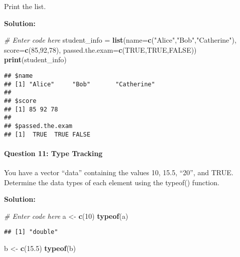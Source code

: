 \documentclass[
]{article}
\newenvironment{Shaded}{\begin{snugshade}}{\end{snugshade}}
\newcommand{\AttributeTok}[1]{\textcolor[rgb]{0.13,0.29,0.53}{#1}}
\newcommand{\CommentTok}[1]{\textcolor[rgb]{0.56,0.35,0.01}{\textit{#1}}}
\newcommand{\ConstantTok}[1]{\textcolor[rgb]{0.56,0.35,0.01}{#1}}
\newcommand{\DecValTok}[1]{\textcolor[rgb]{0.00,0.00,0.81}{#1}}
\newcommand{\FloatTok}[1]{\textcolor[rgb]{0.00,0.00,0.81}{#1}}
\newcommand{\FunctionTok}[1]{\textcolor[rgb]{0.13,0.29,0.53}{\textbf{#1}}}
\newcommand{\NormalTok}[1]{#1}
\newcommand{\OtherTok}[1]{\textcolor[rgb]{0.56,0.35,0.01}{#1}}
\newcommand{\StringTok}[1]{\textcolor[rgb]{0.31,0.60,0.02}{#1}}
\begin{document}
Print the list.

\textbf{Solution:}

\begin{Shaded}
\begin{Highlighting}[]
\CommentTok{\# Enter code here}
\NormalTok{student\_info }\OtherTok{=} \FunctionTok{list}\NormalTok{(}\AttributeTok{name=}\FunctionTok{c}\NormalTok{(}\StringTok{"Alice"}\NormalTok{,}\StringTok{"Bob"}\NormalTok{,}\StringTok{"Catherine"}\NormalTok{), }\AttributeTok{score=}\FunctionTok{c}\NormalTok{(}\DecValTok{85}\NormalTok{,}\DecValTok{92}\NormalTok{,}\DecValTok{78}\NormalTok{), }\AttributeTok{passed.the.exam=}\FunctionTok{c}\NormalTok{(}\ConstantTok{TRUE}\NormalTok{,}\ConstantTok{TRUE}\NormalTok{,}\ConstantTok{FALSE}\NormalTok{))}
\FunctionTok{print}\NormalTok{(student\_info)}
\end{Highlighting}
\end{Shaded}

\begin{verbatim}
## $name
## [1] "Alice"     "Bob"       "Catherine"
## 
## $score
## [1] 85 92 78
## 
## $passed.the.exam
## [1]  TRUE  TRUE FALSE
\end{verbatim}

\hypertarget{question-11-type-tracking}{%
\paragraph{Question 11: Type Tracking}\label{question-11-type-tracking}}

You have a vector ``data'' containing the values 10, 15.5, ``20'', and
TRUE. Determine the data types of each element using the typeof()
function.

\textbf{Solution:}

\begin{Shaded}
\begin{Highlighting}[]
\CommentTok{\# Enter code here}
\NormalTok{a }\OtherTok{\textless{}{-}} \FunctionTok{c}\NormalTok{(}\DecValTok{10}\NormalTok{)}
\FunctionTok{typeof}\NormalTok{(a)}
\end{Highlighting}
\end{Shaded}

\begin{verbatim}
## [1] "double"
\end{verbatim}

\begin{Shaded}
\begin{Highlighting}[]
\NormalTok{b }\OtherTok{\textless{}{-}} \FunctionTok{c}\NormalTok{(}\FloatTok{15.5}\NormalTok{)}
\FunctionTok{typeof}\NormalTok{(b)}
\end{Highlighting}
\end{Shaded}
\end{document}
